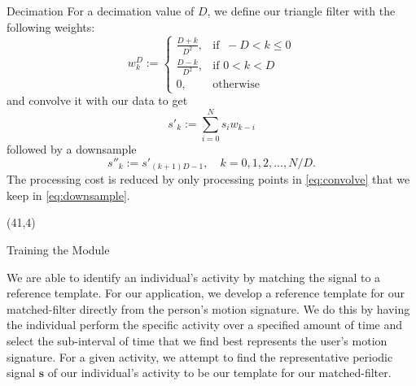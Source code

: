 \documentclass[unknownkeysallowed,final]{beamer}
\begin{document}
\begin{frame}{}
\begin{textblock}{18}
\begin{block}{\small{Decimation}}
For a decimation value of $D$, we define our triangle filter with the following weights:
%
\begin{equation} \label{eq:triangle_filter_weights}
w_k^D :=
\begin{cases}
  \frac{D+k}{D^2}, & \text{if }\ -D < k \leq 0 \\
  \frac{D-k}{D^2}, & \text{if } 0 < k < D \\
  0, & \text{otherwise}
\end{cases}
\end{equation}
%
and convolve it with our data to get
%
\begin{equation} \label{eq:convolve}
s'_k := \sum_{i=0}^{N} s_i w_{k-i}
\end{equation}
%
followed by a downsample
%
\begin{equation} \label{eq:downsample}
s''_k := s'_{(k+1)D-1}, \quad k = 0, 1, 2, ..., N/D.
\end{equation}
%
The processing cost is reduced by only processing points in \eqref{eq:convolve} that we keep in \eqref{eq:downsample}.
\end{block}


\end{textblock}

\begin{textblock}{17.3}(41,4)

\begin{block}{\small{Training the Module}}

We are able to identify an individual's activity by matching the signal to a reference template.
For our application, we develop a reference template for our matched-filter directly from the person's motion signature.
We do this by having the individual perform the specific activity over a specified amount of time and select the sub-interval of time that we find best represents the user's motion signature.
For a given activity, we attempt to find the representative periodic signal $\textbf{s}$ of our individual's activity to be our template for our matched-filter.


\end{block}
\end{textblock}
\end{frame}
\end{document}
